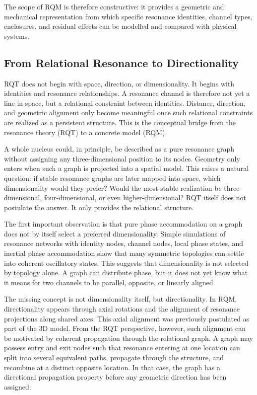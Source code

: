 \documentclass[11pt,a4paper]{article}
\begin{document}
The scope of RQM is therefore constructive: it provides a geometric and mechanical representation from which specific resonance identities, channel types, enclosures, and residual effects can be modelled and compared with physical systems.



\subsection{From Relational Resonance to Directionality}

RQT does not begin with space, direction, or dimensionality. It begins with identities and resonance relationships. A resonance channel is therefore not yet a line in space, but a relational constraint between identities. Distance, direction, and geometric alignment only become meaningful once such relational constraints are realized as a persistent structure. This is the conceptual bridge from the resonance theory (RQT) to a concrete model (RQM). 

A whole nucleus could, in principle, be described as a pure resonance graph without assigning any three-dimensional position to its nodes. Geometry only enters when such a graph is projected into a spatial model. This raises a natural question: if stable resonance graphs are later mapped into space, which dimensionality would they prefer? Would the most stable realization be three-dimensional, four-dimensional, or even higher-dimensional? RQT itself does not postulate the answer. It only provides the relational structure.

The first important observation is that pure phase accommodation on a graph does not by itself select a preferred dimensionality. Simple simulations of resonance networks with identity nodes, channel nodes, local phase states, and inertial phase accommodation show that many symmetric topologies can settle into coherent oscillatory states. This suggests that dimensionality is not selected by topology alone. A graph can distribute phase, but it does not yet know what it means for two channels to be parallel, opposite, or linearly aligned.

The missing concept is not dimensionality itself, but directionality. In RQM, directionality appears through axial rotations and the alignment of resonance projections along shared axes. This axial alignment was previously postulated as part of the 3D model. From the RQT perspective, however, such alignment can be motivated by coherent propagation through the relational graph. A graph may possess entry and exit nodes such that resonance entering at one location can split into several equivalent paths, propagate through the structure, and recombine at a distinct opposite location. In that case, the graph has a directional propagation property before any geometric direction has been assigned.
\end{document}
